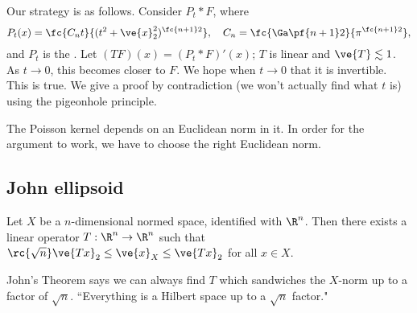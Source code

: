 
Our strategy is as follows. Consider $P_t*F$, where 
\[
P_t(x)=\fc{C_nt}{(t^2+\ve{x}_2^2)^{\fc{n+1}2}}, \quad C_n=\fc{\Ga\pf{n+1}2}{\pi^{\fc{n+1}2}},
\]
and $P_t$ is the . 
Let $(TF)(x)=(P_t*F)'(x)$; $T$ is linear and $\ve{T}\lesssim 1$. As $t\to 0$, this becomes closer to $F$. We hope when $t\to 0$ that it is invertible. This is true. We give a proof by contradiction (we won't actually find what $t$ is) using the pigeonhole principle. %

The Poisson kernel depends on an Euclidean norm in it. 
In order for the argument to work, we have to choose the right Euclidean norm.

\subsection{John ellipsoid}

\begin{thm}
Let $X$ be a $n$-dimensional normed space, identified with $\R^n$. Then there exists a linear operator $T:\R^n\to \R^n$ such that $\rc{\sqrt{n}}\ve{Tx}_2\le \ve{x}_X \le \ve{Tx}_2$ for all $x\in X$.
\end{thm}
John's Theorem says we can always find $T$ which sandwiches the $X$-norm up to a factor of $\sqrt n$. 
``Everything is a Hilbert space up to a $\sqrt n$ factor."

